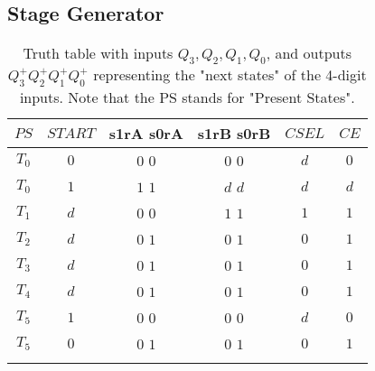 \documentclass[11pt,a4paper,english]{article}
\begin{document}
  \subsection*{Stage Generator}
   \begin{table}[h!]
     \centering
     \caption{
         Truth table with inputs $Q_3, Q_2, Q_1, Q_0$, and outputs $Q_3^+ Q_2^+ Q_1^+ Q_0^+$ representing the "next states" of the 4-digit inputs. Note that the PS stands for "Present States".
         }
     
      \begin{tabular}{c|c|c|c|c|c}%
         \toprule%
         $ PS $             &        $START$            &        s1rA    s0rA           &        s1rB    s0rB      &          $CSEL$           &           $CE$                   \\
         \midrule%
             $T_0$            &          $0$              &          $0$       $0$        &        $0$      $0$      &          $d$            &           $0$                    \\ \hdashline%
             $T_0$            &          $1$              &          $1$       $1$        &        $d$      $d$      &          $d$            &           $d$                    \\ \hdashline%
             $T_1$            &          $d$              &          $0$       $0$        &        $1$      $1$      &          $1$            &           $1$                    \\ \hdashline%
             $T_2$            &          $d$              &          $0$       $1$        &        $0$      $1$      &          $0$            &           $1$                    \\ \hdashline%
             $T_3$            &          $d$              &          $0$       $1$        &        $0$      $1$      &          $0$            &           $1$                    \\ \hdashline%
             $T_4$            &          $d$              &          $0$       $1$        &        $0$      $1$      &          $0$            &           $1$                    \\ \hdashline%
             $T_5$            &          $1$              &          $0$       $0$        &        $0$      $0$      &          $d$            &           $0$                    \\ \hdashline%
             $T_5$            &          $0$              &          $0$       $1$        &        $0$      $1$      &          $0$            &           $1$                    \\ \hdashline%
      \end{tabular}
    \label{table:1}
  \end{table}
        
    
\pagebreak

\pagebreak
\end{document}
